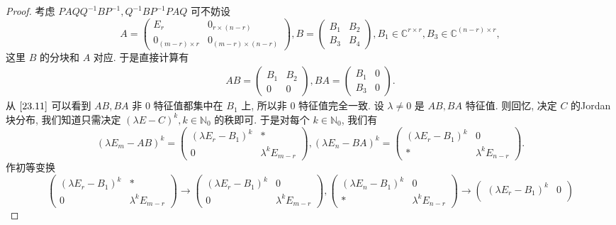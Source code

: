 \documentclass[../../main.tex]{subfiles}%
\begin{document}
\begin{proof}
考虑 \( PAQQ^{-1}BP^{-1}, Q^{-1}BP^{-1}PAQ \) 可不妨设
\[
A = \begin{pmatrix}
E_r & 0_{r \times (n - r)} \\
0_{(m - r) \times r} & 0_{(m - r) \times (n - r)}
\end{pmatrix}, B = \begin{pmatrix}
B_1 & B_2 \\
B_3 & B_4
\end{pmatrix}, B_1 \in \mathbb{C}^{r \times r}, B_3 \in \mathbb{C}^{(n - r) \times r},
\]
这里 \( B \) 的分块和 \( A \) 对应. 于是直接计算有
\begin{align}
AB = \begin{pmatrix}
B_1 & B_2 \\
0 & 0
\end{pmatrix}, BA = \begin{pmatrix}
B_1 & 0 \\
B_3 & 0
\end{pmatrix}. \label{23.11}
\end{align}
从 \(\eqref{23.11}\) 可以看到 \( AB, BA \) 非 0 特征值都集中在 \( B_1 \) 上, 所以非 0 特征值完全一致. 设 \( \lambda \neq 0 \) 是 \( AB, BA \) 特征值. 则回忆, 决定 \( C \) 的Jordan 块分布, 我们知道只需决定 \( (\lambda E - C)^k, k \in \mathbb{N}_0 \) 的秩即可. 于是对每个 \( k \in \mathbb{N}_0 \), 我们有
\[
(\lambda E_m - AB)^k = \begin{pmatrix}
(\lambda E_r - B_1)^k & * \\
0 & \lambda^k E_{m - r}
\end{pmatrix}, (\lambda E_n - BA)^k = \begin{pmatrix}
(\lambda E_r - B_1)^k & 0 \\
* & \lambda^k E_{n - r}
\end{pmatrix}.
\]
作初等变换
\[
\begin{pmatrix}
(\lambda E_r - B_1)^k & * \\
0 & \lambda^k E_{m - r}
\end{pmatrix} \to \begin{pmatrix}
(\lambda E_r - B_1)^k & 0 \\
0 & \lambda^k E_{m - r}
\end{pmatrix}, \begin{pmatrix}
(\lambda E_n - B_1)^k & 0 \\
* & \lambda^k E_{n - r}
\end{pmatrix} \to \begin{pmatrix}
(\lambda E_r - B_1)^k & 0 \\

\end{pmatrix}\]
\end{proof}
\end{document}
